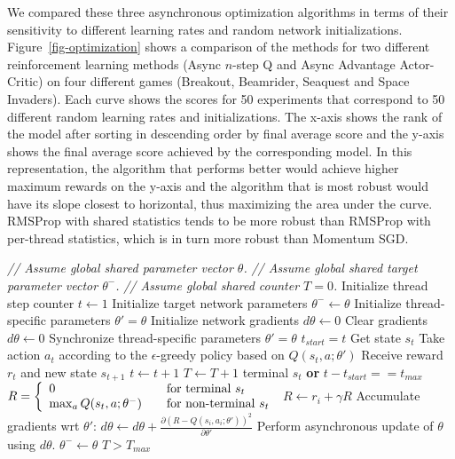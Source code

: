 We compared these three asynchronous optimization algorithms in terms of their sensitivity to different learning rates and random network initializations.
%
%
%
Figure~\ref{fig-optimization} shows a comparison of the methods for two different reinforcement learning methods (Async $n$-step Q and Async Advantage Actor-Critic) on four different games (Breakout, Beamrider, Seaquest and Space Invaders).
Each curve shows the scores for 50 experiments that correspond to 50 different random learning rates and initializations.
The x-axis shows the rank of the model after sorting in descending order by final average score and the y-axis shows the final average score achieved by the corresponding model.
In this representation, the algorithm that performs better would achieve higher maximum rewards on the y-axis and the algorithm that is most robust would have its slope closest to horizontal, thus maximizing the area under the curve.
RMSProp with shared statistics tends to be more robust than RMSProp with per-thread statistics, which is in turn more robust than Momentum SGD.




%
%
%
%
%
%
%
%
%
%
%




\begin{algorithm}[h]
\caption{Asynchronous n-step Q-learning - pseudocode for each actor-learner thread.}
\begin{algorithmic}
\small
\State \emph{// Assume global shared parameter vector $\theta$.}
\State \emph{// Assume global shared target parameter vector $\theta^-$.}
\State \emph{// Assume global shared counter $T=0$.}
\State Initialize thread step counter $t\gets 1$
\State Initialize target network parameters $\theta^- \gets \theta$
\State Initialize thread-specific parameters $\theta' = \theta$
\State Initialize network gradients $d\theta \gets 0$
\Repeat
\State Clear gradients $d\theta \gets 0$
\State Synchronize thread-specific parameters $\theta'=\theta$
\State $t_{start} = t$
\State Get state $s_t$
\Repeat
\State Take action $a_t$ according to the $\epsilon$-greedy policy based on $Q(s_t,a;\theta')$
\State Receive reward $r_t$ and new state $s_{t+1}$
\State $t \gets t + 1$
\State $T \gets T + 1$
\Until terminal $s_t$ \textbf{or} $t - t_{start} == t_{max}$
\State $R =
    \left\{
    \begin{array}{l l}
      0  \quad & \text{for terminal } s_t\\
      \max_a Q(s_t,a;\theta^-) \quad & \text{for non-terminal } s_t
    \end{array} \right.$
\State $R \gets r_i + \gamma R$
\State Accumulate gradients wrt $\theta'$: $d\theta \gets d\theta + \frac{\partial\left(R - Q(s_i,a_i;\theta')\right)^2}{\partial \theta'}$
\EndFor
\State Perform asynchronous update of $\theta$ using $d\theta$.
%
\State $\theta^- \gets \theta$
\EndIf
\Until $T > T_{max}$
\end{algorithmic}
\label{alg:msq}
\end{algorithm}

